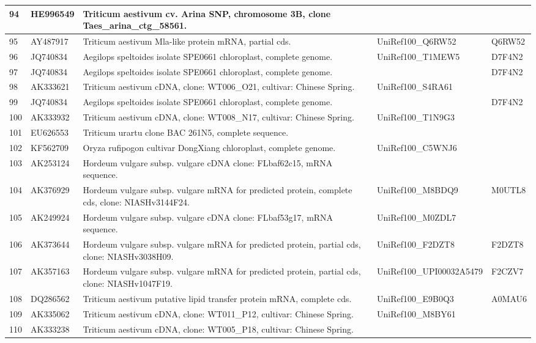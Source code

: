 \documentclass[10.9pt]{article} %
\begin{document}
{\begin{longtable}{|p{1.3cm}|p{1.8cm}|p{6.2cm}|p{3.8cm}|p{2cm}|}
\hline
94 & HE996549 & Triticum aestivum cv. Arina SNP, chromosome 3B, clone Taes\_arina\_ctg\_58561. &  & \\
\hline
95 & AY487917 & Triticum aestivum Mla-like protein mRNA, partial cds. & UniRef100\_Q6RW52 & Q6RW52\\
\hline
96 & JQ740834 & Aegilops speltoides isolate SPE0661 chloroplast, complete genome. & UniRef100\_T1MEW5 & D7F4N2\\
\hline
97 & JQ740834 & Aegilops speltoides isolate SPE0661 chloroplast, complete genome. &  & D7F4N2\\
\hline
98 & AK333621 & Triticum aestivum cDNA, clone: WT006\_O21, cultivar: Chinese Spring. & UniRef100\_S4RA61 & \\
\hline
99 & JQ740834 & Aegilops speltoides isolate SPE0661 chloroplast, complete genome. &  & D7F4N2\\
\hline
100 & AK333932 & Triticum aestivum cDNA, clone: WT008\_N17, cultivar: Chinese Spring. & UniRef100\_T1N9G3 & \\
\hline
101 & EU626553 & Triticum urartu clone BAC 261N5, complete sequence. &  & \\
\hline
102 & KF562709 & Oryza rufipogon cultivar DongXiang chloroplast, complete genome. & UniRef100\_C5WNJ6 & \\
\hline
103 & AK253124 & Hordeum vulgare subsp. vulgare cDNA clone: FLbaf62c15, mRNA sequence. &  & \\
\hline
104 & AK376929 & Hordeum vulgare subsp. vulgare mRNA for predicted protein, complete cds, clone: NIASHv3144F24. & UniRef100\_M8BDQ9 & M0UTL8\\
\hline
105 & AK249924 & Hordeum vulgare subsp. vulgare cDNA clone: FLbaf53g17, mRNA sequence. & UniRef100\_M0ZDL7 & \\
\hline
106 & AK373644 & Hordeum vulgare subsp. vulgare mRNA for predicted protein, partial cds, clone: NIASHv3038H09. & UniRef100\_F2DZT8 & F2DZT8\\
\hline
107 & AK357163 & Hordeum vulgare subsp. vulgare mRNA for predicted protein, partial cds, clone: NIASHv1047F19. & UniRef100\_UPI00032A5479 & F2CZV7\\
\hline
108 & DQ286562 & Triticum aestivum putative lipid transfer protein mRNA, complete cds. & UniRef100\_E9B0Q3 & A0MAU6\\
\hline
109 & AK335062 & Triticum aestivum cDNA, clone: WT011\_P12, cultivar: Chinese Spring. & UniRef100\_M8BY61 & \\
\hline
110 & AK333238 & Triticum aestivum cDNA, clone: WT005\_P18, cultivar: Chinese Spring. &  & \\

\end{longtable}}
\end{document}
